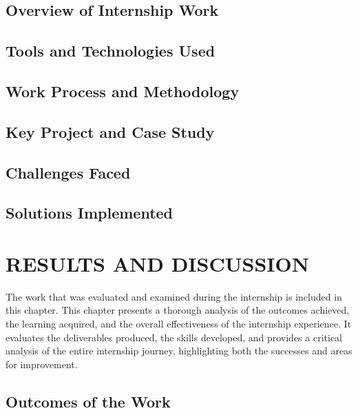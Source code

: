 \documentclass[12pt,a4paper]{report}
\begin{document}
\section{Overview of Internship Work}


\section{Tools and Technologies Used}




\section{Work Process and Methodology}


\section{Key Project and Case Study}




\section{Challenges Faced}


\section{Solutions Implemented}


\chapter{RESULTS AND DISCUSSION}
\label{ch:results}


The work that was evaluated and examined during the internship is included in this chapter. This chapter presents a thorough analysis of the outcomes achieved, the learning acquired, and the overall effectiveness of the internship experience. It evaluates the deliverables produced, the skills developed, and provides a critical analysis of the entire internship journey, highlighting both the successes and areas for improvement.




\section{Outcomes of the Work}
\end{document}
